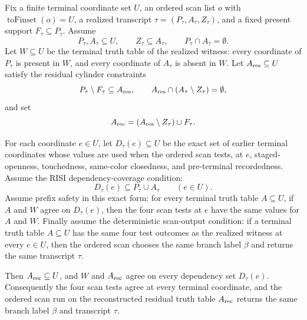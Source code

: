 \begin{helper}
Fix a finite terminal coordinate set \(U\), an ordered scan list \(o\) with
\(\operatorname{toFinset}(o)=U\), a realized transcript
\(\tau=(P_\tau,A_\tau,Z_\tau)\), and a fixed present support
\(F_\tau\subseteq P_\tau\).  Assume
\[
P_\tau,A_\tau\subseteq U,\qquad
Z_\tau\subseteq A_\tau,\qquad P_\tau\cap A_\tau=\emptyset .
\]
Let \(W\subseteq U\) be the terminal truth table of the realized witness:
every coordinate of \(P_\tau\) is present in \(W\), and every coordinate of
\(A_\tau\) is absent in \(W\).  Let \(A_{\rm res}\subseteq U\) satisfy the
residual cylinder constraints
\[
P_\tau\setminus F_\tau\subseteq A_{\rm res},\qquad
A_{\rm res}\cap(A_\tau\setminus Z_\tau)=\emptyset ,
\]
and set
\[
A_{\rm rec}=(A_{\rm res}\setminus Z_\tau)\cup F_\tau .
\]

For each coordinate \(e\in U\), let \(D_\tau(e)\subseteq U\) be the exact
set of earlier terminal coordinates whose values are used when the ordered
scan tests, at \(e\), staged-openness, touchedness, same-color closedness,
and pre-terminal recordedness.  Assume the RISI dependency-coverage
condition:
\[
D_\tau(e)\subseteq P_\tau\cup A_\tau\qquad(e\in U).
\]
Assume prefix safety in this exact form: for every terminal truth table
\(A\subseteq U\), if \(A\) and \(W\) agree on \(D_\tau(e)\), then the four
scan tests at \(e\) have the same values for \(A\) and \(W\).  Finally assume
the deterministic scan-output condition: if a terminal truth table
\(A\subseteq U\) has the same four test outcomes as the realized witness at
every \(e\in U\), then the ordered scan chooses the same branch label
\(\beta\) and returns the same transcript \(\tau\).

Then \(A_{\rm rec}\subseteq U\), and \(W\) and \(A_{\rm rec}\) agree on
every dependency set \(D_\tau(e)\).  Consequently the four scan tests agree
at every terminal coordinate, and the ordered scan run on the reconstructed
residual truth table \(A_{\rm rec}\) returns the same branch label
\(\beta\) and transcript \(\tau\).
\end{helper}
